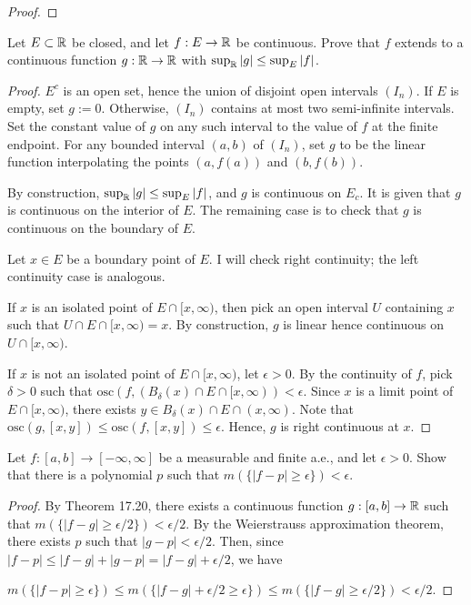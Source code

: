 \documentclass{article}
\newcommand{\osc}{\mathrm{osc}}
\begin{document}
\begin{proof}

\end{proof}
 Let $E \subset \mathbb{R}$ be closed, and let $f:E\to \mathbb{R}$ be continuous. Prove that $f$ extends to a continuous function $g:\mathbb{R}\to\mathbb{R}$ with $\sup_{\mathbb{R}} |g| \le \sup_E |f|$.
\begin{proof}
$E^c$ is an open set, hence the union of disjoint open intervals $(I_n)$. If $E$ is empty, set $g:= 0$.  Otherwise, $(I_n)$ contains at most two semi-infinite intervals. Set the constant value of $g$ on any such interval to the value of $f$ at the finite endpoint.  For any bounded interval $(a,b)$ of $(I_n)$, set $g$ to be the linear function interpolating the points $(a, f(a))$ and $(b,f(b))$.

By construction, $\sup_{\mathbb{R}} |g| \le \sup_E |f|$, and $g$ is continuous on $E_c$.  It is given that $g$ is continuous on the interior of $E$.  The remaining case is to check that $g$ is continuous on the boundary of $E$.

Let $x \in E$ be a boundary point of $E$.  I will check right continuity; the left continuity case is analogous.

 If $x$ is an isolated point of $E \cap [x, \infty)$, then pick an open interval $U$ containing $x$ such that $U \cap E \cap [x, \infty) = x$.  By construction, $g$ is linear hence continuous on $U \cap [x,\infty)$.

If $x$ is not an isolated point of $E \cap [x, \infty)$, let $\epsilon > 0$. By the continuity of $f$, pick $\delta>0$ such that $\osc(f, (B_\delta(x) \cap E \cap [x,\infty)) < \epsilon$. Since $x$ is a limit point of $E \cap [x, \infty)$, there exists $y \in B_\delta(x) \cap E \cap (x,\infty)$. Note that $\osc(g, [x,y]) \le \osc(f, [x,y]) \le \epsilon$. Hence, $g$ is right continuous at $x$.
\end{proof}
 Let $f: [a,b] \to [-\infty,\infty]$ be a measurable and finite a.e., and let $\epsilon > 0$. Show that there is a polynomial $p$ such that  $m(\{|f - p| \ge \epsilon\}) < \epsilon$.
\begin{proof} 
By Theorem 17.20, there exists a continuous function $g:[a,b] \to \mathbb{R}$ such that $m(\{|f - g| \ge \epsilon/2\}) < \epsilon/2$.  By the Weierstrauss approximation theorem, there exists $p$ such that $|g-p| < \epsilon/2$.  Then, 
since $|f - p| \le |f - g| + |g - p| = |f - g| + \epsilon/2$, we have

 $m(\{|f - p| \ge \epsilon\}) \le m(\{|f - g| + \epsilon/2 \ge \epsilon\}) \le m(\{|f - g| \ge \epsilon/2\})  < \epsilon/2.$
\end{proof}
\end{document}
